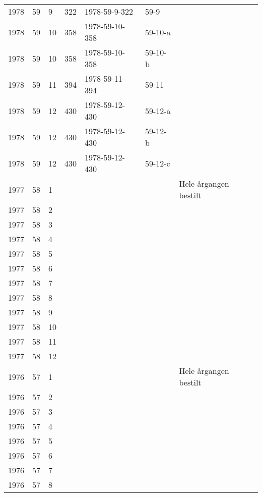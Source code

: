 \begin{longtable}{ |l|l|l|l|p{2.7cm}|l|p{2cm}| }
 1978 & 59 &     9 &     322 & 1978-59-9-322  & 59-9  & \\
 1978 & 59 &    10 &     358 & 1978-59-10-358 & 59-10-a & \\
 1978 & 59 &    10 &     358 & 1978-59-10-358 & 59-10-b & \\
 1978 & 59 &    11 &     394 & 1978-59-11-394 & 59-11 & \\
 1978 & 59 &    12 &     430 & 1978-59-12-430 & 59-12-a & \\
 1978 & 59 &    12 &     430 & 1978-59-12-430 & 59-12-b & \\
 1978 & 59 &    12 &     430 & 1978-59-12-430 & 59-12-c & \\
 1977 & 58 &     1 &         &                &  & Hele årgangen bestilt \\
 1977 & 58 &     2 &         &                &  & \\
 1977 & 58 &     3 &         &                &  & \\
 1977 & 58 &     4 &         &                &  & \\
 1977 & 58 &     5 &         &                &  & \\
 1977 & 58 &     6 &         &                &  & \\
 1977 & 58 &     7 &         &                &  & \\
 1977 & 58 &     8 &         &                &  & \\
 1977 & 58 &     9 &         &                &  & \\
 1977 & 58 &    10 &         &                &  & \\
 1977 & 58 &    11 &         &                &  & \\
 1977 & 58 &    12 &         &                &  & \\
 1976 & 57 &     1 &         &                &  & Hele årgangen bestilt\\
 1976 & 57 &     2 &         &                &  & \\
 1976 & 57 &     3 &         &                &  & \\
 1976 & 57 &     4 &         &                &  & \\
 1976 & 57 &     5 &         &                &  & \\
 1976 & 57 &     6 &         &                &  & \\
 1976 & 57 &     7 &         &                &  & \\
 1976 & 57 &     8 &         &                &  & \\

\end{longtable}
